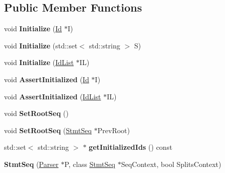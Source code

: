\subsection*{Public Member Functions}
\begin{DoxyCompactItemize}
\item 
\mbox{\label{class_stmt_seq_ace7cc2cf4e1de29084cccccb15faf232}} 
void {\bfseries Initialize} (\mbox{\hyperlink{class_id}{Id}} $\ast$I)
\item 
\mbox{\label{class_stmt_seq_ae34093bcad1344e65b81a0551d5512b9}} 
void {\bfseries Initialize} (std\+::set$<$ std\+::string $>$ S)
\item 
\mbox{\label{class_stmt_seq_abb4e03f592fc37395c898662ab181688}} 
void {\bfseries Initialize} (\mbox{\hyperlink{class_id_list}{Id\+List}} $\ast$IL)
\item 
\mbox{\label{class_stmt_seq_a4fe17dd7802a0d496add30b731447a12}} 
void {\bfseries Assert\+Initialized} (\mbox{\hyperlink{class_id}{Id}} $\ast$I)
\item 
\mbox{\label{class_stmt_seq_a38e5ba9ff740619f5fd82e86ad3890a9}} 
void {\bfseries Assert\+Initialized} (\mbox{\hyperlink{class_id_list}{Id\+List}} $\ast$IL)
\item 
\mbox{\label{class_stmt_seq_addd6910699f83d10d9e0315c10ad0f8d}} 
void {\bfseries Set\+Root\+Seq} ()
\item 
\mbox{\label{class_stmt_seq_a858eac92b3d5b7cf7a53fc26c3b5bd5e}} 
void {\bfseries Set\+Root\+Seq} (\mbox{\hyperlink{class_stmt_seq}{Stmt\+Seq}} $\ast$Prev\+Root)
\item 
\mbox{\label{class_stmt_seq_a1b2f517f912900133bb6d26ef4240354}} 
std\+::set$<$ std\+::string $>$ $\ast$ {\bfseries get\+Initialized\+Ids} () const
\item 
\mbox{\label{class_stmt_seq_ae66fab7ac0dff813661f5cfa00cbd055}} 
{\bfseries Stmt\+Seq} (\mbox{\hyperlink{class_parser}{Parser}} $\ast$P, class \mbox{\hyperlink{class_stmt_seq}{Stmt\+Seq}} $\ast$Seq\+Context, bool Splits\+Context)
\item 

\end{DoxyCompactItemize}
